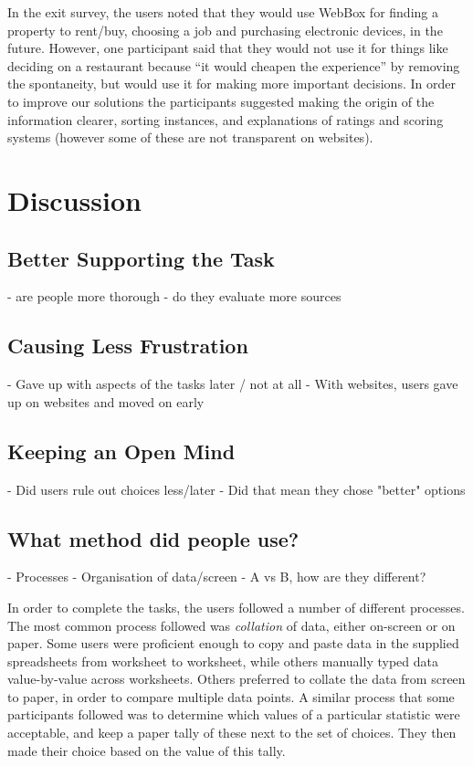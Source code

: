 \documentclass{sigchi}
\begin{document}
In the exit survey, the users noted that they would use WebBox for finding a property to rent/buy, choosing a job and purchasing electronic devices, in the future.  However, one participant said that they would not use it for things like deciding on a restaurant because ``it would cheapen the experience'' by removing the spontaneity, but would use it for making more important decisions.  In order to improve our solutions the participants suggested making the origin of the information clearer, sorting instances, and explanations of ratings and scoring systems (however some of these are not transparent on websites).

\section{Discussion}

\subsection{Better Supporting the Task}

- are people more thorough
- do they evaluate more sources

\subsection{Causing Less Frustration}

- Gave up with aspects of the tasks later / not at all
- With websites, users gave up on websites and moved on early

\subsection{Keeping an Open Mind}

- Did users rule out choices less/later
- Did that mean they chose "better" options

\subsection{What method did people use?}

- Processes
- Organisation of data/screen
- A vs B, how are they different?



In order to complete the tasks, the users followed a number of different processes. The most common process followed
was {\it collation} of data, either on-screen or on paper. Some users were proficient enough to copy and paste data
in the supplied spreadsheets from worksheet to worksheet, while others manually typed data value-by-value across worksheets.
Others preferred to collate the data from screen to paper, in order to compare multiple data points. A similar process that
some participants followed was to determine which values of a particular statistic were acceptable, and keep a paper tally
of these next to the set of choices. They then made their choice based on the value of this tally.
\end{document}
